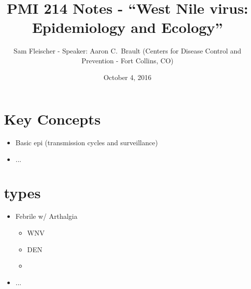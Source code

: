 \documentclass{article}
\title{PMI 214 Notes - ``West Nile virus: Epidemiology and Ecology''}
\author{Sam Fleischer - Speaker: Aaron C.~Brault (Centers for Disease Control and Prevention - Fort Collins, CO)}
\date{October 4, 2016}
\begin{document}
    \maketitle

    \section{Key Concepts}
        \begin{itemize}
            \item Basic epi (transmission cycles and surveillance)
            \item ...
        \end{itemize}

    \section{types}
        \begin{itemize}
            \item Febrile w/ Arthalgia
            \begin{itemize}
                \item WNV
                \item DEN
                \item 
            \end{itemize}
            \item ...
        \end{itemize}
\end{document}
